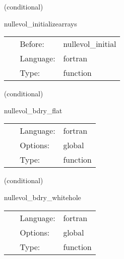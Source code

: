    (conditional) 

\hspace{5mm} nullevol\_initializearrays 

\hspace{5mm}{\it initialize all arrays to large values } 


\hspace{5mm}

 \begin{tabular*}{160mm}{cll} 
~ & Before:  & nullevol\_initial \\ 
~ & Language:  & fortran \\ 
~ & Type:  & function \\ 
\end{tabular*} 


\vspace{5mm}

   (conditional) 

\hspace{5mm} nullevol\_bdry\_flat 

\hspace{5mm}{\it give flat boundary conditions for the null metric } 


\hspace{5mm}

 \begin{tabular*}{160mm}{cll} 
~ & Language:  & fortran \\ 
~ & Options:  & global \\ 
~ & Type:  & function \\ 
\end{tabular*} 


\vspace{5mm}

   (conditional) 

\hspace{5mm} nullevol\_bdry\_whitehole 

\hspace{5mm}{\it give white hole boundary conditions for the null metric } 


\hspace{5mm}

 \begin{tabular*}{160mm}{cll} 
~ & Language:  & fortran \\ 
~ & Options:  & global \\ 
~ & Type:  & function \\ 
\end{tabular*} 


